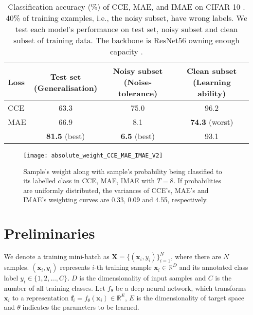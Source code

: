 \documentclass{article}
\begin{document}
\begin{table}[!t]
	\caption{
		Classification accuracy (\%) of CCE, MAE, and IMAE on CIFAR-10 \cite{krizhevsky2009learning}. 
		40\% of training examples, i.e., the noisy subset, have wrong labels. 
		We test each model's performance on test set, noisy subset and clean subset of training data. 
		The backbone is ResNet56 owning enough capacity \cite{he2016deep}. 
	}
	\vspace{-0.2cm}
	\centering
	\setlength{\tabcolsep}{0.85pt} \fontsize{9.6pt}{9.6pt}\selectfont
	\begin{tabular}{lccc}
		\toprule
		Loss &  \makecell{Test set\\(Generalisation)} & \makecell{Noisy subset\\(Noise-tolerance)} & \makecell{Clean subset\\(Learning ability)}\\
		\midrule
CCE & 63.3 & 75.0 & 96.2\\
		MAE & 66.9 & 8.1 & \textbf{74.3} (worst)\\
		\midrule
		\makecell{IMAE} & \textbf{81.5} (best) & \textbf{6.5} (best) & 93.1\\
		\bottomrule
	\end{tabular}
	\label{table:MAE_observations}
\end{table}


\begin{figure}[!t]
	\centering
	\vspace{-0.2cm}
	\texttt{[image: absolute\_weight\_CCE\_MAE\_IMAE\_V2]}
	\vspace{-0.1cm}
	\caption{
		Sample's weight along with sample's probability being classified to its labelled class in CCE, MAE, IMAE with $T=8$. 
If probabilities are uniformly distributed, the variances of CCE's, MAE's and IMAE's weighting curves are 0.33, 0.09 and 4.55, respectively. 
	}
	\label{fig:absolute_weight_CCE_MAE_IMAE_V02}
	\vspace{-0.1cm}
\end{figure}




\section{Preliminaries}

We denote a training mini-batch as $\mathbf{X}=\{(\mathbf{x}_i, y_i)\}_{i=1}^{N}$, where there are $N$ samples. $(\mathbf{x}_i, y_i)$ represents $i$-th training sample $\mathbf{x}_i \in \mathbb{R}^D$ and its annotated class label $y_i \in \{1,2,...,C\}$. $D$ is the dimensionality of input samples and $C$ is the number of all training classes.
Let $f_{\theta}$ be a deep neural network, which transforms $\mathbf{x}_i$ to a representation $\mathbf{f}_i = f_{\theta}(\mathbf{x}_i) \in \mathbb{R}^E$, $E$ is the dimensionality of target space and $\theta$ indicates the parameters to be learned. 
\end{document}
